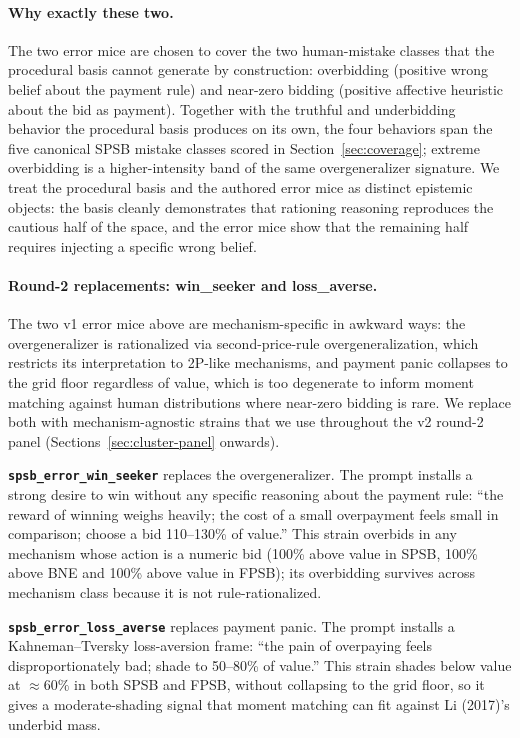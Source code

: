 \documentclass[12pt]{article}
\newcommand{\SPSB}{SPSB}
\begin{document}
\paragraph{Why exactly these two.} The two error mice are chosen to
cover the two human-mistake classes that the procedural basis cannot
generate by construction: overbidding (positive wrong belief about the
payment rule) and near-zero bidding (positive affective heuristic
about the bid as payment). Together with the truthful and underbidding
behavior the procedural basis produces on its own, the four behaviors
span the five canonical \SPSB{} mistake classes scored in
Section~\ref{sec:coverage}; extreme overbidding is a higher-intensity
band of the same overgeneralizer signature. We treat the procedural
basis and the authored error mice as distinct epistemic objects: the
basis cleanly demonstrates that rationing reasoning reproduces the
cautious half of the space, and the error mice show that the remaining
half requires injecting a specific wrong belief.

\paragraph{Round-2 replacements: win\_seeker and loss\_averse.}
The two v1 error mice above are mechanism-specific in awkward ways:
the overgeneralizer is rationalized via second-price-rule
overgeneralization, which restricts its interpretation to 2P-like
mechanisms, and payment panic collapses to the grid floor regardless
of value, which is too degenerate to inform moment matching against
human distributions where near-zero bidding is rare. We replace both
with mechanism-agnostic strains that we use throughout the v2
round-2 panel (Sections~\ref{sec:cluster-panel} onwards).

\textbf{\texttt{spsb\_error\_win\_seeker}} replaces the
overgeneralizer. The prompt installs a strong desire to win without
any specific reasoning about the payment rule: ``the reward of
winning weighs heavily; the cost of a small overpayment feels small
in comparison; choose a bid 110--130\% of value.'' This strain
overbids in any mechanism whose action is a numeric bid (100\% above
value in \SPSB{}, 100\% above BNE and 100\% above value in FPSB);
its overbidding survives across mechanism class because it is not
rule-rationalized.

\textbf{\texttt{spsb\_error\_loss\_averse}} replaces payment
panic. The prompt installs a Kahneman--Tversky loss-aversion frame:
``the pain of overpaying feels disproportionately bad; shade to
50--80\% of value.'' This strain shades below value at $\approx 60\%$
in both \SPSB{} and FPSB, without collapsing to the grid floor, so
it gives a moderate-shading signal that moment matching can fit
against Li (2017)'s underbid mass.
\end{document}
